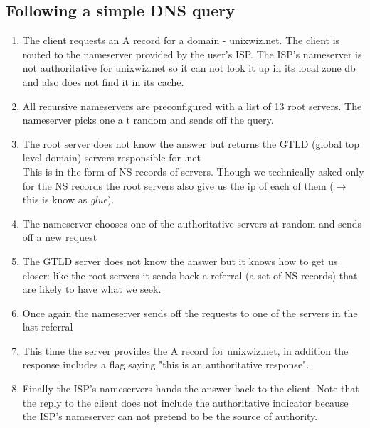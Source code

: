 \documentclass[10pt,a4paper]{book}
\begin{document}
\subsection{Following a simple DNS query}
\begin{enumerate}
\item The client requests an A record for a domain - unixwiz.net. The client is routed to the nameserver provided by the user's ISP. The ISP's nameserver is not authoritative for unixwiz.net so it can not look it up in its local zone db and also does not find it in its cache.
\item All recursive nameservers are preconfigured with a list of 13 root servers. The nameserver picks one a t random and sends off the query. 
\item The root server does not know the answer but returns the GTLD (global top level domain) servers responsible for .net\\
This is in the form of NS records of servers. Though we technically asked only for the NS records the root servers also give us the ip of each of them ($\to$ this is know as \emph{glue}).
\item The nameserver chooses one of the authoritative servers at random and sends off a new request
\item The GTLD server does not know the answer but it knows how to get us closer: like the root servers it sends back a referral (a set of NS records) that are likely to have what we seek.
\item Once again the nameserver sends off the requests to one of the servers in the last referral
\item This time the server provides the A record for unixwiz.net, in addition the response includes a flag saying "this is an authoritative response".
\item Finally the ISP's nameservers hands the answer back to the client. Note that the reply to the client does not include the authoritative indicator because the ISP's nameserver can not pretend to be the source of authority.
\end{enumerate}
\end{document}
